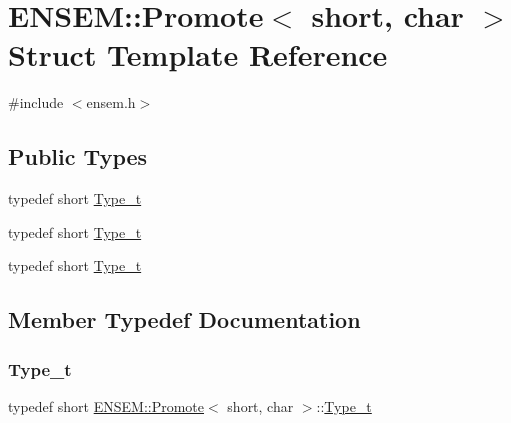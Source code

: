 \hypertarget{structENSEM_1_1Promote_3_01short_00_01char_01_4}{}\section{E\+N\+S\+EM\+:\+:Promote$<$ short, char $>$ Struct Template Reference}
\label{structENSEM_1_1Promote_3_01short_00_01char_01_4}


{\ttfamily \#include $<$ensem.\+h$>$}

\subsection*{Public Types}
\begin{DoxyCompactItemize}
\item 
typedef short \mbox{\hyperlink{structENSEM_1_1Promote_3_01short_00_01char_01_4_a17ccbda3b4c4ad881634810abd3eb2dc}{Type\+\_\+t}}
\item 
typedef short \mbox{\hyperlink{structENSEM_1_1Promote_3_01short_00_01char_01_4_a17ccbda3b4c4ad881634810abd3eb2dc}{Type\+\_\+t}}
\item 
typedef short \mbox{\hyperlink{structENSEM_1_1Promote_3_01short_00_01char_01_4_a17ccbda3b4c4ad881634810abd3eb2dc}{Type\+\_\+t}}
\end{DoxyCompactItemize}


\subsection{Member Typedef Documentation}
\mbox{\label{structENSEM_1_1Promote_3_01short_00_01char_01_4_a17ccbda3b4c4ad881634810abd3eb2dc}} 
\subsubsection{\texorpdfstring{Type\_t}{Type\_t}\hspace{0.1cm}{\footnotesize\ttfamily [1/3]}}
{\footnotesize\ttfamily typedef short \mbox{\hyperlink{structENSEM_1_1Promote}{E\+N\+S\+E\+M\+::\+Promote}}$<$ short, char $>$\+::\mbox{\hyperlink{structENSEM_1_1Promote_3_01short_00_01char_01_4_a17ccbda3b4c4ad881634810abd3eb2dc}{Type\+\_\+t}}}


